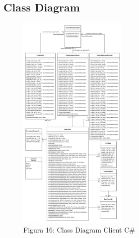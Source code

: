 \subsection{Class Diagram}
\begin{figure}[h]
	\centering
	\includegraphics[width=0.47\textwidth]{class-diagram-client.png} \newline
	\caption*{Figura 16: Class Diagram Client C\#}
\end{figure}
\clearpage
